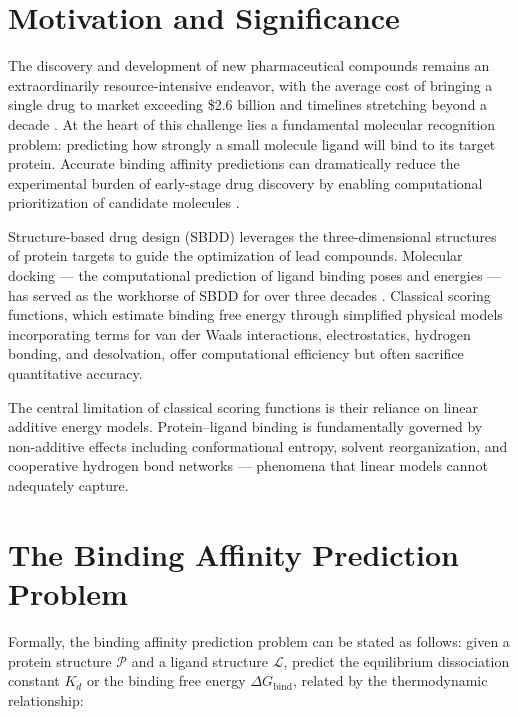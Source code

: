 \documentclass[12pt,oneside]{report}
\begin{document}
\section{Motivation and Significance}

The discovery and development of new pharmaceutical compounds remains an extraordinarily resource-intensive endeavor, with the average cost of bringing a single drug to market exceeding \$2.6 billion and timelines stretching beyond a decade \cite{DiMasi2016}. At the heart of this challenge lies a fundamental molecular recognition problem: predicting how strongly a small molecule ligand will bind to its target protein. Accurate binding affinity predictions can dramatically reduce the experimental burden of early-stage drug discovery by enabling computational prioritization of candidate molecules \cite{Lyu2019}.

Structure-based drug design (SBDD) leverages the three-dimensional structures of protein targets to guide the optimization of lead compounds. Molecular docking --- the computational prediction of ligand binding poses and energies --- has served as the workhorse of SBDD for over three decades \cite{Kitchen2004}. Classical scoring functions, which estimate binding free energy through simplified physical models incorporating terms for van der Waals interactions, electrostatics, hydrogen bonding, and desolvation, offer computational efficiency but often sacrifice quantitative accuracy.

\begin{insightbox}
The central limitation of classical scoring functions is their reliance on linear additive energy models. Protein--ligand binding is fundamentally governed by non-additive effects including conformational entropy, solvent reorganization, and cooperative hydrogen bond networks --- phenomena that linear models cannot adequately capture.
\end{insightbox}

\section{The Binding Affinity Prediction Problem}

Formally, the binding affinity prediction problem can be stated as follows: given a protein structure $\mathcal{P}$ and a ligand structure $\mathcal{L}$, predict the equilibrium dissociation constant $K_d$ or the binding free energy $\Delta G_{\text{bind}}$, related by the thermodynamic relationship:
\end{document}
